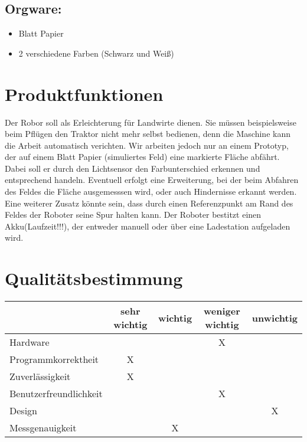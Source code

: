 \documentclass[12pt,a4paper]{article}
\begin{document}
\subsection{Orgware:}
\begin{itemize}
\item Blatt Papier
\item 2 verschiedene Farben (Schwarz und Weiß)
\end{itemize}



\section{ Produktfunktionen}

Der Robor soll als Erleichterung für Landwirte dienen. Sie müssen beispielsweise beim Pflügen den Traktor nicht mehr selbst bedienen, denn die Maschine kann die Arbeit automatisch verichten.
Wir arbeiten jedoch nur an einem Prototyp, der auf einem Blatt Papier (simuliertes Feld) eine markierte Fläche abfährt. 
Dabei soll er durch den Lichtsensor den Farbunterschied erkennen und entsprechend handeln.
Eventuell erfolgt eine Erweiterung, bei der beim Abfahren des Feldes die Fläche ausgemesssen wird, oder auch Hindernisse erkannt werden.
Eine weiterer Zusatz könnte sein, dass durch einen Referenzpunkt am Rand des Feldes der Roboter seine Spur halten kann.
Der Roboter bestitzt einen Akku(Laufzeit!!!), der entweder manuell oder über eine Ladestation aufgeladen wird.

\section{ Qualitätsbestimmung}

\begin{tabular}{l||c|c|c|c}

 &sehr wichtig & wichtig& weniger wichtig& unwichtig\\
 \hline
 \hline
 Hardware&&& X & \\
 \hline
 Programmkorrektheit& X &  & &\\
 \hline
 Zuverlässigkeit& X &  &  & \\
 \hline
 Benutzerfreundlichkeit& & &X &\\
 \hline
 Design&&&&X\\
 \hline
 Messgenauigkeit&&X&&\\
 
\end{tabular}
\end{document}
